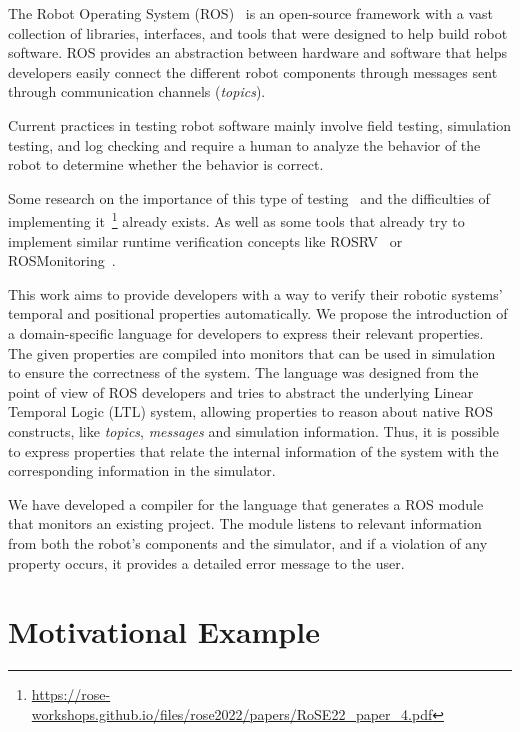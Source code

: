 \documentclass[runningheads]{llncs}
\begin{document}
The Robot Operating System (ROS)~\cite{quigley2009ros} is an open-source framework with a vast collection of libraries, interfaces, and tools that were designed to help build robot software. ROS provides an abstraction between hardware and software that helps developers easily connect the different robot components through messages sent through communication channels (\textit{topics}).

Current practices in testing robot software mainly involve field testing, simulation testing, and log checking and require a human to analyze the behavior of the robot to determine whether the behavior is correct.

Some research on the importance of this type of testing~\cite{zizyte2021safetyauto} and the difficulties of implementing it~\footnote{\url{https://rose-workshops.github.io/files/rose2022/papers/RoSE22\_paper\_4.pdf}} already exists. As well as some tools that already try to implement similar runtime verification concepts like ROSRV~\cite{huang2014rosrv} or ROSMonitoring~\cite{ferrando2020rosmonitoring}.



This work aims to provide developers with a way to verify their robotic systems' temporal and positional properties automatically. We propose the introduction of a domain-specific language for developers to express their relevant properties. The given properties are compiled into monitors that can be used in simulation to ensure the correctness of the system. The language was designed from the point of view of ROS developers and tries to abstract the underlying Linear Temporal Logic (LTL) system, allowing properties to reason about native ROS constructs, like \textit{topics}, \textit{messages} and simulation information. Thus, it is possible to express properties that relate the internal information of the system with the corresponding information in the simulator.

We have developed a compiler for the language that generates a ROS module that monitors an existing project. The module listens to relevant information from both the robot's components and the simulator, and if a violation of any property occurs, it provides a detailed error message to the user.


\section{Motivational Example}
\end{document}

